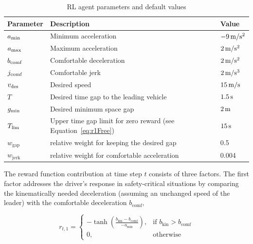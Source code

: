 \documentclass[review]{elsarticle}
\providecommand{\sub}[1]{_{\mathrm{#1}}}  %
\providecommand{\3}{{\ss}}
\begin{document}
	\begin{table}
		\caption{RL agent parameters and default values} 
		\label{tab:agentParameters} 
		\begin{center}
			\begin{tabular}{ p{}| p{}| p{}}
				Parameter & Description & Value \\ \hline
				$a\sub{\rm min}$ & Minimum acceleration & $\unit[-9]{m/s^2}$ \\  
				$a_{\rm max}$ & Maximum acceleration & $\unit[2]{m/s^2}$ \\  
				$b_{\rm comf}$ & Comfortable deceleration & $\unit[2]{m/s^2}$ \\  
				$j_{\rm comf}$ & Comfortable jerk & $\unit[2]{m/s^3}$ \\  
				$v_{\rm des}$ & Desired speed & $\unit[15]{ m/s}$ \\  		
				$T$ & Desired time gap to the leading vehicle & $\unit[1.5]{s}$ \\
				$g_{\rm min}$ & Desired minimum space gap & $\unit[2]{m}$ \\
				$T_{\rm lim}$ & Upper time gap limit for zero reward (see
				Equation~\eqref{eq:r1Free}) & $\unit[15]{s}$ \\
				$w\sub{gap}$ & relative weight for keeping the desired gap & 0.5\\
				$w\sub{jerk}$ & relative weight for comfortable acceleration & 0.004\\
			\end{tabular}
		\end{center}
	\end{table}
	
	
	
	The reward function contribution at time step $t$ consists of three factors. 
	The first factor addresses the driver's
	response in safety-critical situations by comparing the
	kinematically needed deceleration (assuming an
	unchanged speed of the leader) with the
	comfortable deceleration $b\sub{comf}$,
	
	
	
	\begin{equation}
	\label{eq:r1_CFP}
	r_{t,1} = 
	\begin{cases}
	-\tanh\left(\frac{b\sub{kin}-b\sub{comf}}{-a\sub{min}}\right),& \text{if } b\sub{kin}>b\sub{comf}\\
	0,              & \text{otherwise}
	\end{cases}
	\end{equation}
	
\end{document}
